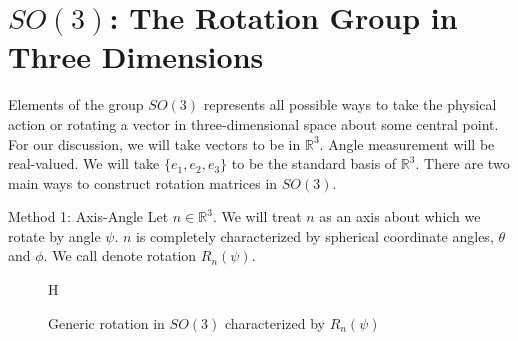 \documentclass[compress,aspectratio=169,10pt,usenames,dvipsnames]{beamer}
\newcommand{\R}{\mathbb{R}}
\begin{document}
\section{$SO(3)$: The Rotation Group in Three Dimensions}
\begin{frame}
\sectionpage
\end{frame}
%
%
\begin{frame}
\vfill
Elements of the group $SO(3)$ represents all possible ways to take the physical action or rotating a vector in three-dimensional space about some central point. 
\vfill
For our discussion, we will take vectors to be in $\R^3$.
\vfill
Angle measurement will be real-valued.
\vfill
We will take $\{e_1,e_2,e_3\}$ to be the standard basis of $\R^3$.
\vfill
There are two main ways to construct rotation matrices in $SO(3)$.
\vfill
\end{frame}
%
%
\begin{frame}
Method 1: Axis-Angle
\vfill
Let $n\in\R^3$. We will treat $n$ as an axis about which we rotate by angle $\psi$. $n$ is completely characterized by spherical coordinate angles, $\theta$ and $\phi$. We call denote rotation $R_n(\psi)$.
\vfill
\begin{figure}{H}
	\centering
	\centering
	\caption{Generic rotation in $SO(3)$ characterized by $R_n(\psi)$}		
\end{figure}
\vfill
\end{frame}
\end{document}
